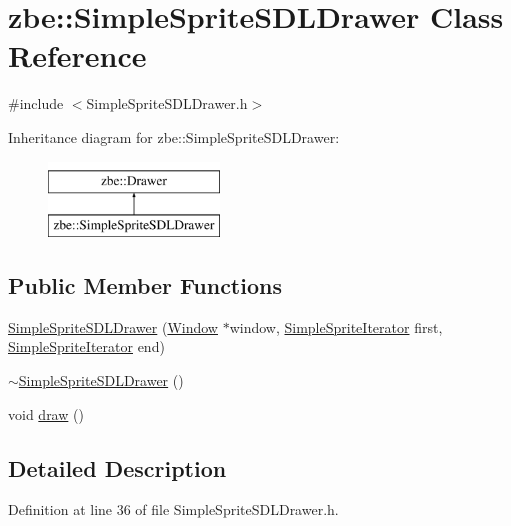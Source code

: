 \hypertarget{classzbe_1_1_simple_sprite_s_d_l_drawer}{}\section{zbe\+:\+:Simple\+Sprite\+S\+D\+L\+Drawer Class Reference}
\label{classzbe_1_1_simple_sprite_s_d_l_drawer}


{\ttfamily \#include $<$Simple\+Sprite\+S\+D\+L\+Drawer.\+h$>$}

Inheritance diagram for zbe\+:\+:Simple\+Sprite\+S\+D\+L\+Drawer\+:\begin{figure}[H]
\begin{center}
\leavevmode
\includegraphics[height=2.000000cm]{classzbe_1_1_simple_sprite_s_d_l_drawer}
\end{center}
\end{figure}
\subsection*{Public Member Functions}
\begin{DoxyCompactItemize}
\item 
\hyperlink{classzbe_1_1_simple_sprite_s_d_l_drawer_a71a07190fa1d7a0c1aca3fe961c1b930}{Simple\+Sprite\+S\+D\+L\+Drawer} (\hyperlink{classzbe_1_1_window}{Window} $\ast$window, \hyperlink{namespacezbe_aa6d4affc7b95360c2d43d5fde9837a1f}{Simple\+Sprite\+Iterator} first, \hyperlink{namespacezbe_aa6d4affc7b95360c2d43d5fde9837a1f}{Simple\+Sprite\+Iterator} end)
\item 
\hyperlink{classzbe_1_1_simple_sprite_s_d_l_drawer_a8e2fd374fa5515e68355c1fbfe155bd8}{$\sim$\+Simple\+Sprite\+S\+D\+L\+Drawer} ()
\item 
void \hyperlink{classzbe_1_1_simple_sprite_s_d_l_drawer_af807a5376aafaa13dce5b8e8edf3973b}{draw} ()
\end{DoxyCompactItemize}


\subsection{Detailed Description}


Definition at line 36 of file Simple\+Sprite\+S\+D\+L\+Drawer.\+h.



